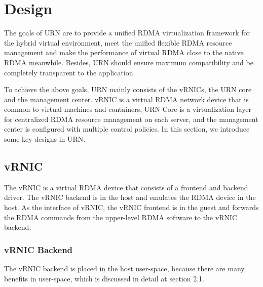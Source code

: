 \section{Design}

The goals of URN are to provide a unified RDMA virtualization framework for the hybrid virtual environment, meet the unified flexible RDMA resource management and make the performance of virtual RDMA close to the native RDMA meanwhile. Besides, URN should ensure maximum compatibility and be completely transparent to the application. 

To achieve the above goals, URN mainly consists of the vRNICs, the URN core and the management center. vRNIC is a virtual RDMA network device that is common to virtual machines and containers, URN Core is a virtualization layer for centralized RDMA resource management on each server, and the management center is configured with multiple control policies. In this section, we introduce some key designs in URN.

\subsection{vRNIC}

The vRNIC is a virtual RDMA device that consists of a frontend and backend driver. The vRNIC backend is in the host and emulates the RDMA device in the host. As the interface of vRNIC, the vRNIC frontend is in the guest and forwards the RDMA commands from the upper-level RDMA software to the vRNIC backend. 

\subsubsection{vRNIC Backend}

The vRNIC backend is placed in the host user-space, because there are many benefits in user-space, which is discussed in detail at section 2.1.

